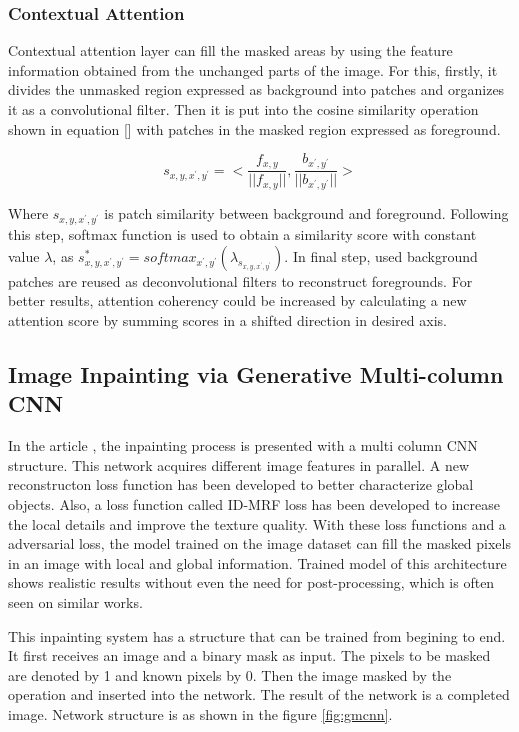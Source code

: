 \subsubsection{Contextual Attention}

Contextual attention layer can fill the masked areas by using the feature information obtained from the unchanged parts of the image. For this, firstly, it divides the unmasked region expressed as background into patches and organizes it as a convolutional filter. Then it is put into the cosine similarity operation shown in equation [] with patches in the masked region expressed as foreground.

\begin{equation}
\label{eqn:context}
    s_{x,y,x^{'},y^{'}} = <\frac{f_{x,y}}{||f_{x,y}||}, \frac{b_{x^',y^'}}{||b_{x^{'},y^{'}}||}>
\end{equation}

Where \(s_{x,y,x^{'},y^{'}}\) is patch similarity between background and foreground. Following this step, softmax function is used to obtain a similarity score with constant value \(\lambda\), as \(s^{*}_{x,y,x^{'},y^{'}} = softmax_{x^{'},y^{'} } ( \lambda_{s_{x,y,x^{'},y^{'} } } )\). In final step, used background patches are reused as deconvolutional filters to reconstruct foregrounds. For better results, attention coherency could be increased by calculating a new attention score by summing scores in a shifted direction in desired axis.

\subsection{Image Inpainting via Generative Multi-column CNN}

In the article \cite{inpainting_via_multi_cnn}, the inpainting process is presented with a multi column CNN structure. This network acquires different image features in parallel. A new reconstructon loss function has been developed to better characterize global objects. Also, a loss function called ID-MRF loss has been developed to increase the local details and improve the texture quality. With these loss functions and a adversarial loss, the model trained on the image dataset can fill the masked pixels in an image with local and global information. Trained model of this architecture shows realistic results without even the need for post-processing, which is often seen on similar works.

This inpainting system has a structure that can be trained from begining to end. It first receives an image and a binary mask as input. The pixels to be masked are denoted by 1 and known pixels by 0. Then the image masked by the  operation and inserted into the network. The result of the network is a completed image. Network structure is as shown in the figure \ref{fig:gmcnn}.

